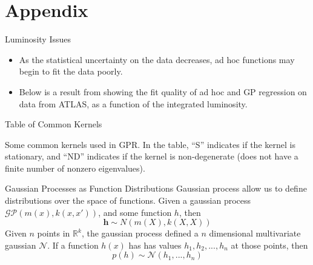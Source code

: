 \documentclass[10pt]{beamer}
\begin{document}
\appendix

\section{Appendix}
\label{sec:appendix}


\begin{frame}{Luminosity Issues}
  \begin{itemize}
  \item As the statistical uncertainty on the data decreases, ad hoc functions may begin to fit the data poorly. 
  \item Below is a result from \cite{frate_modeling_2017} showing the fit quality of ad hoc and GP regression on data from ATLAS, as a function of the integrated luminosity.
  \end{itemize}
  \begin{center}
  \end{center}
\end{frame}

\begin{frame}{Table of Common Kernels}
  \begin{center}
  \end{center}
  \begin{center}
    Some common kernels used in GPR. In the table, ``S'' indicates if the kernel is stationary, and ``ND'' indicates if the kernel is non-degenerate (does not have a finite number of nonzero eigenvalues).
  \end{center}
\end{frame}

\begin{frame}{Gaussian Processes as Function Distributions}
  Gaussian process allow us to define distributions over the space of functions. Given a gaussian process $\mathcal{GP} \left( m(x) , k(x,x') \right)$, and some function $h$, then
  \begin{equation}
    \mathbf{h} \sim N(m(X) , k(X,X))
  \end{equation}
  Given $n$ points in $\mathbb{R}^{k}$, the gaussian process defined a $n$ dimensional multivariate gaussian $\mathcal{N}$. If a function $h(x)$ has has values $h_1,h_2,...,h_{n}$ at those points, then
  \begin{equation}
    p \left( h \right) \sim \mathcal{N}(h_{1}, ..., h_{n})
  \end{equation}

  \begin{center}
  \end{center}
\end{frame}
\end{document}
